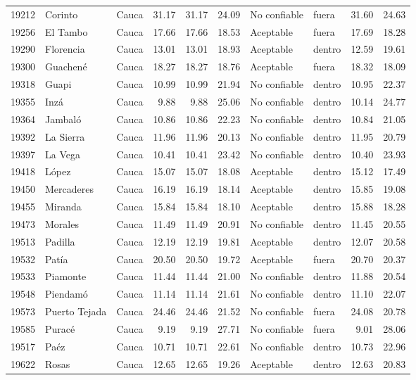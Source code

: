 {\begin{longtable}{l p{3.0cm} l r r r l l r r}
19212 & Corinto & Cauca & 31.17 & 31.17 & 24.09 & No confiable & fuera & 31.60 & 24.63 \\
19256 & El Tambo & Cauca & 17.66 & 17.66 & 18.53 & Aceptable & fuera & 17.69 & 18.28 \\
19290 & Florencia & Cauca & 13.01 & 13.01 & 18.93 & Aceptable & dentro & 12.59 & 19.61 \\
19300 & Guachené & Cauca & 18.27 & 18.27 & 18.76 & Aceptable & fuera & 18.32 & 18.09 \\
19318 & Guapi & Cauca & 10.99 & 10.99 & 21.94 & No confiable & dentro & 10.95 & 22.37 \\
19355 & Inzá & Cauca & 9.88 & 9.88 & 25.06 & No confiable & dentro & 10.14 & 24.77 \\
19364 & Jambaló & Cauca & 10.86 & 10.86 & 22.23 & No confiable & dentro & 10.84 & 21.05 \\
19392 & La Sierra & Cauca & 11.96 & 11.96 & 20.13 & No confiable & dentro & 11.95 & 20.79 \\
19397 & La Vega & Cauca & 10.41 & 10.41 & 23.42 & No confiable & dentro & 10.40 & 23.93 \\
19418 & López & Cauca & 15.07 & 15.07 & 18.08 & Aceptable & dentro & 15.12 & 17.49 \\
19450 & Mercaderes & Cauca & 16.19 & 16.19 & 18.14 & Aceptable & dentro & 15.85 & 19.08 \\
19455 & Miranda & Cauca & 15.84 & 15.84 & 18.10 & Aceptable & dentro & 15.88 & 18.28 \\
19473 & Morales & Cauca & 11.49 & 11.49 & 20.91 & No confiable & dentro & 11.45 & 20.55 \\
19513 & Padilla & Cauca & 12.19 & 12.19 & 19.81 & Aceptable & dentro & 12.07 & 20.58 \\
19532 & Patía & Cauca & 20.50 & 20.50 & 19.72 & Aceptable & fuera & 20.70 & 20.37 \\
19533 & Piamonte & Cauca & 11.44 & 11.44 & 21.00 & No confiable & dentro & 11.88 & 20.54 \\
19548 & Piendamó & Cauca & 11.14 & 11.14 & 21.61 & No confiable & dentro & 11.10 & 22.07 \\
19573 & Puerto Tejada & Cauca & 24.46 & 24.46 & 21.52 & No confiable & fuera & 24.08 & 20.78 \\
19585 & Puracé & Cauca & 9.19 & 9.19 & 27.71 & No confiable & fuera & 9.01 & 28.06 \\
19517 & Paéz & Cauca & 10.71 & 10.71 & 22.61 & No confiable & dentro & 10.73 & 22.96 \\
19622 & Rosas & Cauca & 12.65 & 12.65 & 19.26 & Aceptable & dentro & 12.63 & 20.83 \\

\end{longtable}}
